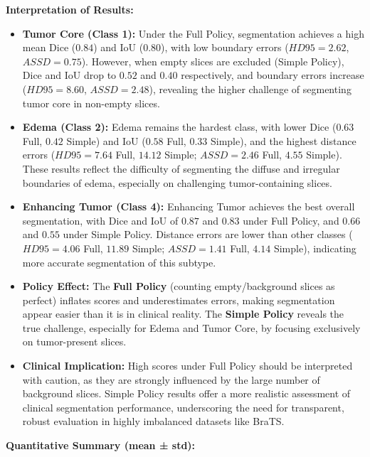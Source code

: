 \textbf{Interpretation of Results:}
\vspace{-1em}
\begin{itemize}
    \item \textbf{Tumor Core (Class 1):} 
    Under the Full Policy, segmentation achieves a high mean Dice ($0.84$) and IoU ($0.80$), with low boundary errors ($HD95 = 2.62$, $ASSD = 0.75$). However, when empty slices are excluded (Simple Policy), Dice and IoU drop to $0.52$ and $0.40$ respectively, and boundary errors increase ($HD95 = 8.60$, $ASSD = 2.48$), revealing the higher challenge of segmenting tumor core in non-empty slices.

    \item \textbf{Edema (Class 2):}
    Edema remains the hardest class, with lower Dice ($0.63$ Full, $0.42$ Simple) and IoU ($0.58$ Full, $0.33$ Simple), and the highest distance errors ($HD95 = 7.64$ Full, $14.12$ Simple; $ASSD = 2.46$ Full, $4.55$ Simple). These results reflect the difficulty of segmenting the diffuse and irregular boundaries of edema, especially on challenging tumor-containing slices.

    \item \textbf{Enhancing Tumor (Class 4):}
    Enhancing Tumor achieves the best overall segmentation, with Dice and IoU of $0.87$ and $0.83$ under Full Policy, and $0.66$ and $0.55$ under Simple Policy. Distance errors are lower than other classes ($HD95 = 4.06$ Full, $11.89$ Simple; $ASSD = 1.41$ Full, $4.14$ Simple), indicating more accurate segmentation of this subtype.

    \item \textbf{Policy Effect:} 
    The \textbf{Full Policy} (counting empty/background slices as perfect) inflates scores and underestimates errors, making segmentation appear easier than it is in clinical reality. The \textbf{Simple Policy} reveals the true challenge, especially for Edema and Tumor Core, by focusing exclusively on tumor-present slices.

    \item \textbf{Clinical Implication:}
    High scores under Full Policy should be interpreted with caution, as they are strongly influenced by the large number of background slices. Simple Policy results offer a more realistic assessment of clinical segmentation performance, underscoring the need for transparent, robust evaluation in highly imbalanced datasets like BraTS.
\end{itemize}

\textbf{Quantitative Summary (mean ± std):}

